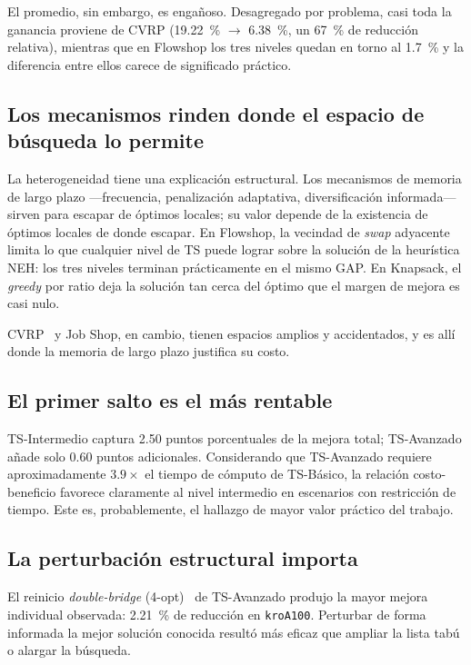 El promedio, sin embargo, es engañoso. Desagregado por problema, casi toda la
ganancia proviene de CVRP (\SI{19.22}{\percent} $\rightarrow$
\SI{6.38}{\percent}, un \SI{67}{\percent} de reducción relativa), mientras
que en Flowshop los tres niveles quedan en torno al \SI{1.7}{\percent} y
la diferencia entre ellos carece de significado práctico.

\subsection{Los mecanismos rinden donde el espacio de búsqueda lo permite}

La heterogeneidad tiene una explicación estructural. Los mecanismos de
memoria de largo plazo —frecuencia, penalización adaptativa, diversificación
informada— sirven para escapar de óptimos locales; su valor depende de la existencia de óptimos locales de donde escapar. En Flowshop, la vecindad
de \emph{swap} adyacente limita lo que cualquier nivel de TS puede lograr
sobre la solución de la heurística NEH: los tres niveles terminan
prácticamente en el mismo GAP. En Knapsack, el \emph{greedy} por ratio
deja la solución tan cerca del óptimo que el margen de mejora es casi nulo.

CVRP~\cite{laporte1992vehicle} y Job Shop, en cambio, tienen espacios amplios y
accidentados, y es allí donde la memoria de largo plazo justifica su costo.

\subsection{El primer salto es el más rentable}

TS-Intermedio captura 2.50 puntos porcentuales de la mejora total;
TS-Avanzado añade solo 0.60 puntos adicionales. Considerando que
TS-Avanzado requiere aproximadamente $3.9\times$ el tiempo de cómputo de
TS-Básico, la relación costo-beneficio favorece claramente al nivel
intermedio en escenarios con restricción de tiempo. Este es, probablemente,
el hallazgo de mayor valor práctico del trabajo.

\subsection{La perturbación estructural importa}

El reinicio \emph{double-bridge} (4-opt)~\cite{lin1973effective} de TS-Avanzado
produjo la mayor mejora individual observada: \SI{2.21}{\percent} de reducción
en \texttt{kroA100}. Perturbar de forma informada la mejor solución conocida
resultó más eficaz que ampliar la lista tabú o alargar la búsqueda.

